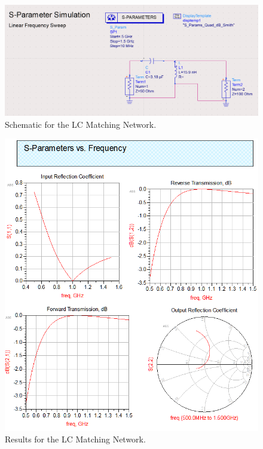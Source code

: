 \begin{figure}[H]
    \centering
    \includegraphics[width=0.8\linewidth]{res/ADS/LCMatchingNetworkSchematic.png}
    \caption{Schematic for the LC Matching Network.}
    \label{fig:}
\end{figure}
\begin{figure}[H]
    \centering
    \includegraphics[width=0.8\linewidth]{res/ADS/LCMatchingNetwork.png}
    \caption{Results for the LC Matching Network.}
    \label{fig:}
\end{figure}

